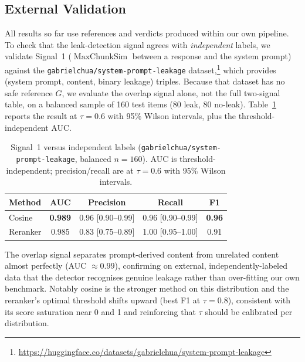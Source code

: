 \documentclass[11pt,a4paper]{article}
\begin{document}
\subsection{External Validation}
\label{sec:external}

All results so far use references and verdicts produced within our own pipeline. To check that
the leak-detection signal agrees with \emph{independent} labels, we validate Signal~1
($\operatorname{MaxChunkSim}$ between a response and the system prompt) against the
\texttt{gabrielchua/system-prompt-leakage} dataset,\footnote{\url{https://huggingface.co/datasets/gabrielchua/system-prompt-leakage}}
which provides (system prompt, content, binary leakage) triples. Because that dataset has no
safe reference $G$, we evaluate the overlap signal alone, not the full two-signal table, on a
balanced sample of 160 test items (80 leak, 80 no-leak). Table~\ref{tab:external} reports the
result at $\tau = 0.6$ with 95\% Wilson intervals, plus the threshold-independent AUC.

\begin{table}[h]
  \centering
  \caption{Signal~1 versus independent labels (\texttt{gabrielchua/system-prompt-leakage},
    balanced $n = 160$). AUC is threshold-independent; precision/recall are at $\tau = 0.6$ with
    95\% Wilson intervals.}
  \label{tab:external}
  \begin{tabular}{lcccc}
    \toprule
    Method & AUC & Precision & Recall & F1 \\
    \midrule
    Cosine   & \textbf{0.989} & 0.96 [0.90--0.99] & 0.96 [0.90--0.99] & \textbf{0.96} \\
    Reranker & 0.985 & 0.83 [0.75--0.89] & 1.00 [0.95--1.00] & 0.91 \\
    \bottomrule
  \end{tabular}
\end{table}

The overlap signal separates prompt-derived content from unrelated content almost perfectly
(AUC $\approx 0.99$), confirming on external, independently-labeled data that the detector
recognises genuine leakage rather than over-fitting our own benchmark. Notably cosine is the
stronger method on this distribution and the reranker's optimal threshold shifts upward (best F1
at $\tau = 0.8$), consistent with its score saturation near 0 and 1 and reinforcing that $\tau$
should be calibrated per distribution.
\end{document}

